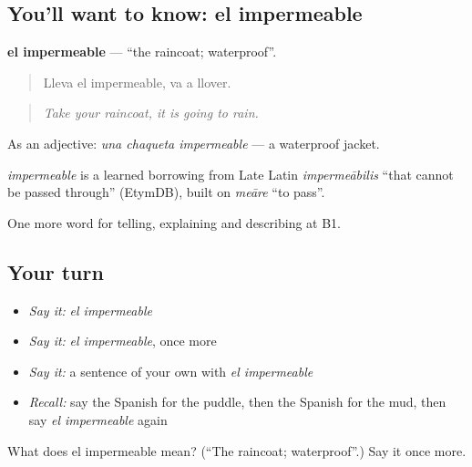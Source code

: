 \subsection*{You'll want to know: el impermeable}
\textbf{el impermeable} — \textquotedblleft{}the raincoat; waterproof\textquotedblright{}.

\begin{quote}
Lleva el impermeable, va a llover.
\end{quote}

\begin{quote}
\emph{Take your raincoat, it is going to rain.}
\end{quote}

As an adjective: \emph{una chaqueta impermeable} — a waterproof jacket.

\begin{cousinweb}
\emph{impermeable} is a learned borrowing from Late Latin \emph{impermeābilis} \textquotedblleft{}that cannot be passed through\textquotedblright{} (EtymDB), built on \emph{meāre} \textquotedblleft{}to pass\textquotedblright{}.
\end{cousinweb}

\begin{grammarlens}[title={What you've built}]
One more word for telling, explaining and describing at B1.
\end{grammarlens}

\subsection*{Your turn}
\begin{itemize}
\raggedright
  \item \emph{Say it:} \emph{el impermeable}
  \item \emph{Say it:} \emph{el impermeable}, once more
  \item \emph{Say it:} a sentence of your own with \emph{el impermeable}
  \item \emph{Recall:} say the Spanish for the puddle, then the Spanish for the mud, then say \emph{el impermeable} again
\end{itemize}

\begin{tcolorbox}[breakable,colback=teal!4,colframe=teal!35!black,title={Before you move on}]
What does el impermeable mean? (\textquotedblleft{}The raincoat; waterproof\textquotedblright{}.) Say it once more.
\end{tcolorbox}

